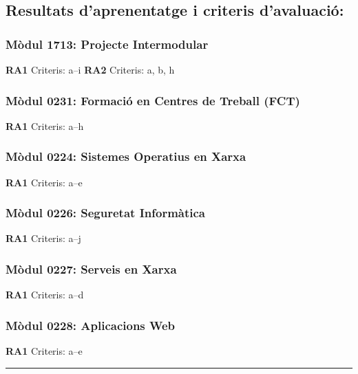 \documentclass[
  a4paper,
]{article}
\begin{document}
\subsection{Resultats d'aprenentatge i criteris
d'avaluació:}\label{resultats-daprenentatge-i-criteris-davaluaciuxf3}

\subsubsection{Mòdul 1713: Projecte
Intermodular}\label{muxf2dul-1713-projecte-intermodular}

\textbf{RA1} Criteris: a--i \textbf{RA2} Criteris: a, b, h

\subsubsection{Mòdul 0231: Formació en Centres de Treball
(FCT)}\label{muxf2dul-0231-formaciuxf3-en-centres-de-treball-fct}

\textbf{RA1} Criteris: a--h

\subsubsection{Mòdul 0224: Sistemes Operatius en
Xarxa}\label{muxf2dul-0224-sistemes-operatius-en-xarxa}

\textbf{RA1} Criteris: a--e

\subsubsection{Mòdul 0226: Seguretat
Informàtica}\label{muxf2dul-0226-seguretat-informuxe0tica}

\textbf{RA1} Criteris: a--j

\subsubsection{Mòdul 0227: Serveis en
Xarxa}\label{muxf2dul-0227-serveis-en-xarxa}

\textbf{RA1} Criteris: a--d

\subsubsection{Mòdul 0228: Aplicacions
Web}\label{muxf2dul-0228-aplicacions-web}

\textbf{RA1} Criteris: a--e

\begin{center}\rule{0.5\linewidth}{0.5pt}\end{center}
\end{document}
